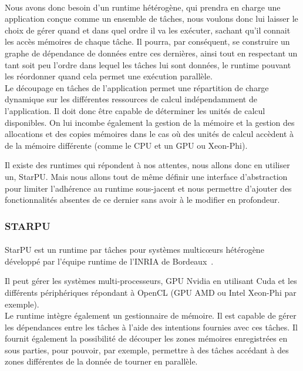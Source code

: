 \paragraph{}
Nous avons donc besoin d'un runtime hétérogène, qui prendra en charge une
application conçue comme un ensemble de tâches, nous voulons donc lui laisser le
choix de gérer quand et dans quel ordre il va les exécuter, sachant qu'il
connait les accès mémoires de chaque tâche. Il pourra, par conséquent, se
construire un graphe de dépendance de données entre ces dernières, ainsi tout en
respectant un tant soit peu l'ordre dans lequel les tâches lui sont données, le
runtime pouvant les réordonner quand cela permet une exécution parallèle.\\
Le découpage en tâches de l’application permet une répartition de charge
dynamique sur les différentes ressources de calcul indépendamment de
l’application. Il doit donc être capable de déterminer les unités de calcul
disponibles. On lui incombe également la gestion de la mémoire et la gestion des
allocations et des copies mémoires dans le cas où des unités de calcul accèdent
à de la mémoire différente (comme le CPU et un GPU ou Xeon-Phi).

Il existe des runtimes qui répondent à nos attentes, nous allons donc en
utiliser un, StarPU. Mais nous allons tout de même définir une interface
d'abstraction pour limiter l'adhérence au runtime sous-jacent et nous permettre
d'ajouter des fonctionnalités absentes de ce dernier sans avoir à le modifier en
profondeur.

\subsubsection{STARPU}
\paragraph{}
\sloppy
StarPU est un runtime par tâches pour systèmes multic\oe{}urs hétérogène
développé par l'équipe runtime de l'INRIA de Bordeaux~\cite{starpu}.

\fussy
Il peut gérer les systèmes multi-processeurs, GPU Nvidia en utilisant Cuda et
les différents périphériques répondant à OpenCL (GPU AMD ou Intel Xeon-Phi par
exemple).\\
Le runtime intègre également un gestionnaire de mémoire. Il est capable de gérer
les dépendances entre les tâches à l’aide des intentions fournies avec ces
tâches. Il fournit également la possibilité de découper les zones mémoires
enregistrées en sous parties, pour pouvoir, par exemple, permettre à des tâches
accédant à des zones différentes de la donnée de tourner en parallèle.

